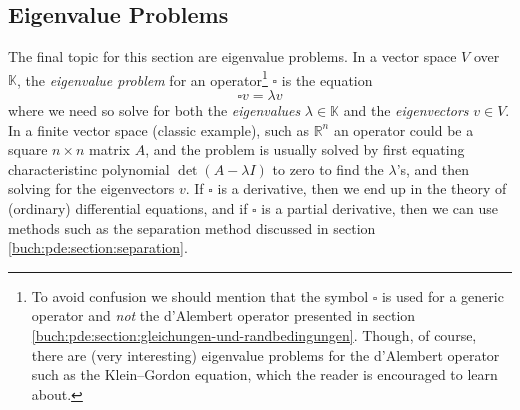 \subsection{Eigenvalue Problems}

The final topic for this section are eigenvalue problems. In a vector space
$V$ over $\mathbb{K}$, the \emph{eigenvalue problem} for an
operator\footnote{To avoid confusion we should mention that the symbol
$\square$ is used for a generic operator and \emph{not} the d'Alembert
operator presented in section
\ref{buch:pde:section:gleichungen-und-randbedingungen}. Though, of course,
there are (very interesting) eigenvalue problems for the d'Alembert operator
such as the Klein–Gordon equation, which the reader is encouraged to learn
about.} $\square$ is the equation
\begin{equation*}
  \square v = \lambda v
\end{equation*}
where we need so solve for both the \emph{eigenvalues} $\lambda \in
\mathbb{K}$ and the \emph{eigenvectors} $v \in V$. In a finite vector space
(classic example), such as $\mathbb{R}^n$ an operator could be a square
$n\times n$ matrix $A$, and the problem is usually solved by first equating
characteristinc polynomial $\det(A - \lambda I)$ to zero to find the
$\lambda$'s, and then solving for the eigenvectors $v$. If $\square$ is a
derivative, then we end up in the theory of (ordinary) differential equations,
and if $\square$ is a partial derivative, then we can use methods such as the
separation method discussed in section \ref{buch:pde:section:separation}.

